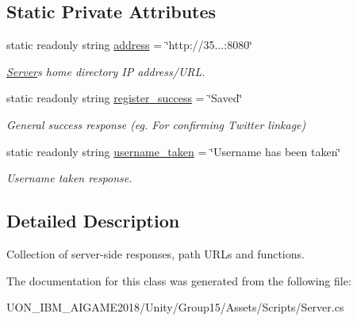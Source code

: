 \subsection*{Static Private Attributes}
\begin{DoxyCompactItemize}
\item 
\mbox{\label{class_server_a4db3f96fe18261d12fd6eef5476aa69d}} 
static readonly string \mbox{\hyperlink{class_server_a4db3f96fe18261d12fd6eef5476aa69d}{address}} = \char`\"{}http\+://35...\+:8080\char`\"{}
\begin{DoxyCompactList}\small\item\em \mbox{\hyperlink{class_server}{Server}}\textquotesingle{}s home directory IP address/\+U\+RL. \end{DoxyCompactList}\item 
\mbox{\label{class_server_a2e16618d6f2b9f4308203f4053d54545}} 
static readonly string \mbox{\hyperlink{class_server_a2e16618d6f2b9f4308203f4053d54545}{register\+\_\+success}} = \char`\"{}Saved\char`\"{}
\begin{DoxyCompactList}\small\item\em General success response (eg. For confirming Twitter linkage) \end{DoxyCompactList}\item 
\mbox{\label{class_server_a0d876aba3addd4f76cf9d998f0552048}} 
static readonly string \mbox{\hyperlink{class_server_a0d876aba3addd4f76cf9d998f0552048}{username\+\_\+taken}} = \char`\"{}Username has been taken\char`\"{}
\begin{DoxyCompactList}\small\item\em Username taken response. \end{DoxyCompactList}\end{DoxyCompactItemize}


\subsection{Detailed Description}
Collection of server-\/side responses, path U\+R\+Ls and functions. 

The documentation for this class was generated from the following file\+:\begin{DoxyCompactItemize}
\item 
U\+O\+N\+\_\+\+I\+B\+M\+\_\+\+A\+I\+G\+A\+M\+E2018/\+Unity/\+Group15/\+Assets/\+Scripts/Server.\+cs\end{DoxyCompactItemize}
